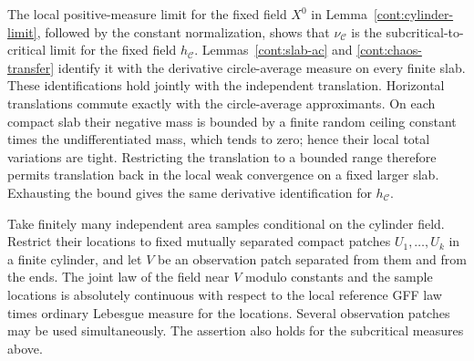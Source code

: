 The local positive-measure limit for the fixed field $X^0$ in
Lemma~\ref{cont:cylinder-limit}, followed by the constant normalization, shows
that $\nu_{\mathcal C}$ is the subcritical-to-critical limit for the fixed
field $h_{\mathcal C}$.  Lemmas~\ref{cont:slab-ac} and
\ref{cont:chaos-transfer} identify it with the derivative circle-average
measure on every finite slab.  These identifications hold jointly with the
independent translation.  Horizontal translations commute exactly with the
circle-average approximants.  On each compact slab their negative mass is
bounded by a finite random ceiling constant times the undifferentiated mass,
which tends to zero; hence their local total variations are tight.
Restricting the translation to a bounded range therefore permits translation
back in the local weak convergence on a fixed larger slab.  Exhausting the
bound gives the same derivative identification for $h_{\mathcal C}$.

\begin{lemma}\label{cont:separated-marks}
Take finitely many independent area samples conditional on the cylinder
field.  Restrict their locations to fixed mutually separated compact patches
$U_1,\ldots,U_k$ in a finite cylinder, and let $V$ be an observation patch
separated from them and from the ends.  The joint law of the field near $V$
modulo constants and the sample locations is absolutely continuous with
respect to the local reference GFF law times ordinary Lebesgue measure for
the locations.  Several observation patches may be used simultaneously.
The assertion also holds for the subcritical measures above.
\end{lemma}


